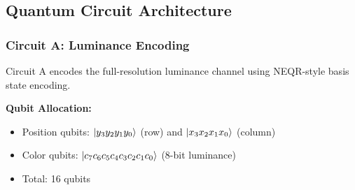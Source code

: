 \documentclass[11pt,a4paper]{article}
\begin{document}
\vspace{0.5em}

\subsection{Quantum Circuit Architecture}

\subsubsection{Circuit A: Luminance Encoding}

Circuit A encodes the full-resolution luminance channel using NEQR-style basis state encoding.

\textbf{Qubit Allocation:}
\begin{itemize}
    \item Position qubits: $\ket{y_3 y_2 y_1 y_0}$ (row) and $\ket{x_3 x_2 x_1 x_0}$ (column)
    \item Color qubits: $\ket{c_7 c_6 c_5 c_4 c_3 c_2 c_1 c_0}$ (8-bit luminance)
    \item Total: 16 qubits
\end{itemize}
\end{document}

